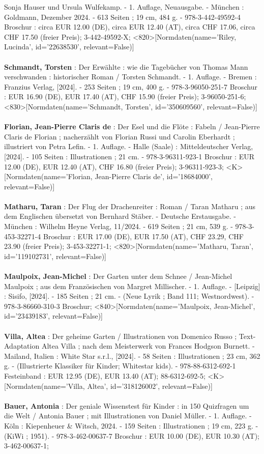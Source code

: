 \documentclass{article}
\begin{document}
\begin{multicols}{3}
Sonja Hauser und Ursula Wulfekamp. - 1. Auflage, Neuausgabe. - München : Goldmann, Dezember 2024. - 613 Seiten ; 19 cm, 484 g. - 978-3-442-49592-4 Broschur : circa EUR 12.00 (DE), circa EUR 12.40 (AT), circa CHF 17.06, circa CHF 17.50 (freier Preis); 3-442-49592-X; <820>[Normdaten(name='Riley, Lucinda', id='22638530', relevant=False)]\\\\\textbf{Schmandt, Torsten} : Der Erwählte : wie die Tagebücher von Thomas Mann verschwanden : historischer Roman / Torsten Schmandt. - 1. Auflage. - Bremen : Franzius Verlag, [2024]. - 253 Seiten ; 19 cm, 400 g. - 978-3-96050-251-7 Broschur : EUR 16.90 (DE), EUR 17.40 (AT), CHF 15.90 (freier Preis); 3-96050-251-6; <830>[Normdaten(name='Schmandt, Torsten', id='350609560', relevant=False)]\\\\\textbf{Florian, Jean-Pierre Claris de} : Der Esel und die Flöte : Fabeln /  Jean-Pierre Claris de Florian ; nacherzählt von Florian Russi und Carolin Eberhardt ; illustriert von Petra Lefin. - 1. Auflage. - Halle (Saale) : Mitteldeutscher Verlag, [2024]. - 105 Seiten : Illustrationen ; 21 cm. - 978-3-96311-923-1 Broschur : EUR 12.00 (DE), EUR 12.40 (AT), CHF 16.80 (freier Preis); 3-96311-923-3; <K>[Normdaten(name='Florian, Jean-Pierre Claris de', id='18684000', relevant=False)]\\\\\textbf{Matharu, Taran} : Der Flug der Drachenreiter : Roman / Taran Matharu ; aus dem Englischen übersetzt von Bernhard Stäber. - Deutsche Erstausgabe. - München : Wilhelm Heyne Verlag, 11/2024. - 619 Seiten ; 21 cm, 539 g. - 978-3-453-32271-4 Broschur : EUR 17.00 (DE), EUR 17.50 (AT), CHF 23.29, CHF 23.90 (freier Preis); 3-453-32271-1; <820>[Normdaten(name='Matharu, Taran', id='119102731', relevant=False)]\\\\\textbf{Maulpoix, Jean-Michel} : Der Garten unter dem Schnee / Jean-Michel Maulpoix ; aus dem Französischen von Margret Millischer. - 1. Auflage. - [Leipzig] : Sisifo, [2024]. - 185 Seiten ; 21 cm. - (Neue Lyrik ; Band 111; Westnordwest). - 978-3-86660-310-3 Broschur; <840>[Normdaten(name='Maulpoix, Jean-Michel', id='23439183', relevant=False)]\\\\\textbf{Villa, Altea} : Der geheime Garten / Illustrationen von Domenico Russo ; Text-Adaptation Altea Villa ; nach dem Meisterwerk von Frances Hodgson Burnett. - Mailand, Italien : White Star s.r.l., [2024]. - 58 Seiten : Illustrationen ; 23 cm, 362 g. - (Illustrierte Klassiker für Kinder; Whitestar kids). - 978-88-6312-692-1 Festeinband : EUR 12.95 (DE), EUR 13.40 (AT); 88-6312-692-5; <K>[Normdaten(name='Villa, Altea', id='318126002', relevant=False)]\\\\\textbf{Bauer, Antonia} : Der geniale Wissenstest für Kinder : in 150 Quizfragen um die Welt / Antonia Bauer ; mit Illustrationen von Daniel Müller. - 1. Auflage. - Köln : Kiepenheuer \& Witsch, 2024. - 159 Seiten : Illustrationen ; 19 cm, 223 g. - (KiWi ; 1951). - 978-3-462-00637-7 Broschur : EUR 10.00 (DE), EUR 10.30 (AT); 3-462-00637-1; 
\end{multicols}
\end{document}

